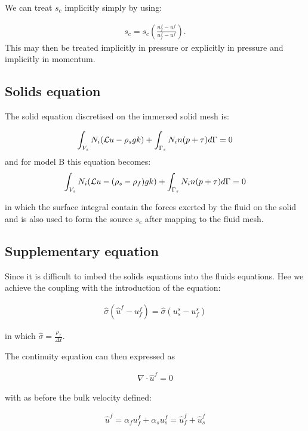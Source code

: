 We can treat $s_c$ implicitly simply by using:

\begin{eqnarray}
s_c= s_c \left( \frac{u^f_f - u^f}{u^f_f - u^f}\right).
\label{imp-s-c}
\end{eqnarray}
This may then be treated implicitly in pressure or
explicitly in pressure and implicitly in momentum.



\subsection{Solids equation}
The solid equation discretised
on the immersed solid mesh is:


\begin{eqnarray}
\int_{V_s} N_i ({\cal L} u - \rho_s g k)
+\int_{\Gamma_s} N_i n (p+\tau)d\Gamma=0
\label{solids-forced}
\end{eqnarray}
and for model B this equation becomes:
\begin{eqnarray}
\int_{V_s} N_i ({\cal L} u - (\rho_s-\rho_f) g k)
+\int_{\Gamma_s} N_i n (p+\tau)d\Gamma=0
\label{solids-forced-modelB}
\end{eqnarray}

in which the surface integral contain the forces
exerted by the fluid on the solid and is also
used to form the source $s_c$ after mapping to the fluid mesh.

\subsection{Supplementary equation}
Since it is difficult to imbed the solids equations into
the fluids equations. Hee we achieve the coupling with the
introduction of the equation:

\begin{eqnarray}
\hat\sigma (\hat u^f - u_f^f) = \hat\sigma( u_s^s-u_f^s)
\label{sigma-hat-eqn}
\end{eqnarray}

in which $\hat\sigma=\frac{\rho_f}{\Delta t}$.

The continuity equation can then expressed as

\begin{eqnarray}
\nabla \cdot \hat u^f=0
\end{eqnarray}

with as before the bulk velocity defined:

\begin{eqnarray}
\hat u^f=\alpha_f u_f^f + \alpha_s u_s^f= \hat u_f^f + \hat u_s^f
\end{eqnarray}

